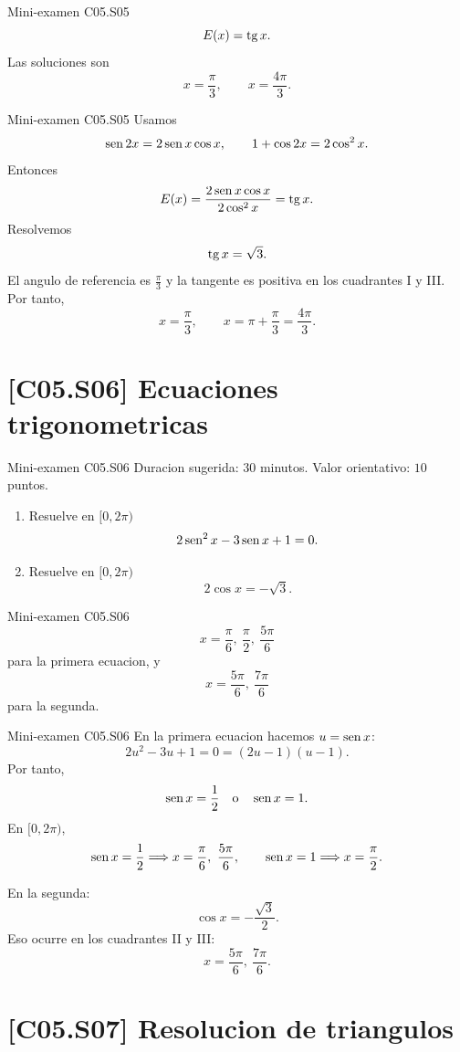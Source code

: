 \begin{shortanswer}{Mini-examen C05.S05}
\[
E(x)=\operatorname{tg} x.
\]
Las soluciones son
\[
x=\frac{\pi}{3},\qquad x=\frac{4\pi}{3}.
\]
\end{shortanswer}

\begin{fullsolution}{Mini-examen C05.S05}
Usamos
\[
\operatorname{sen} 2x=2\operatorname{sen} x\cos x,
\qquad
1+\cos 2x=2\cos^2 x.
\]
Entonces
\[
E(x)=\frac{2\operatorname{sen} x\cos x}{2\cos^2x}=\operatorname{tg} x.
\]
Resolvemos
\[
\operatorname{tg} x=\sqrt3.
\]
El angulo de referencia es \(\frac{\pi}{3}\) y la tangente es positiva en los cuadrantes I y
III. Por tanto,
\[
x=\frac{\pi}{3},\qquad x=\pi+\frac{\pi}{3}=\frac{4\pi}{3}.
\]
\end{fullsolution}

\section{[C05.S06] Ecuaciones trigonometricas}

\begin{exambrief}{Mini-examen C05.S06}
Duracion sugerida: \(30\) minutos. Valor orientativo: \(10\) puntos.
\begin{enumerate}
  \item Resuelve en \([0,2\pi)\)
  \[
  2\operatorname{sen}^2 x-3\operatorname{sen} x+1=0.
  \]
  \item Resuelve en \([0,2\pi)\)
  \[
  2\cos x=-\sqrt3.
  \]
\end{enumerate}
\end{exambrief}

\begin{shortanswer}{Mini-examen C05.S06}
\[
x=\frac{\pi}{6},\ \frac{\pi}{2},\ \frac{5\pi}{6}
\]
para la primera ecuacion, y
\[
x=\frac{5\pi}{6},\ \frac{7\pi}{6}
\]
para la segunda.
\end{shortanswer}

\begin{fullsolution}{Mini-examen C05.S06}
En la primera ecuacion hacemos \(u=\operatorname{sen} x\):
\[
2u^2-3u+1=0=(2u-1)(u-1).
\]
Por tanto,
\[
\operatorname{sen} x=\frac12 \quad \text{o}\quad \operatorname{sen} x=1.
\]
En \([0,2\pi)\),
\[
\operatorname{sen} x=\frac12 \Longrightarrow x=\frac{\pi}{6},\ \frac{5\pi}{6},
\qquad
\operatorname{sen} x=1 \Longrightarrow x=\frac{\pi}{2}.
\]

En la segunda:
\[
\cos x=-\frac{\sqrt3}{2}.
\]
Eso ocurre en los cuadrantes II y III:
\[
x=\frac{5\pi}{6},\ \frac{7\pi}{6}.
\]
\end{fullsolution}

\section{[C05.S07] Resolucion de triangulos}

